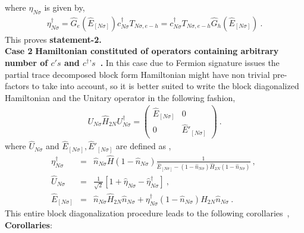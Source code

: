 \documentclass[12pt,a4paper]{article}
\begin{document}
where $\eta_{N\sigma}$ is given by,
\begin{eqnarray}
\eta^{\dagger}_{N\sigma} = \hat{G}_{e}(\hat{E}_{[N\sigma]})c^{\dagger}_{N\sigma}T_{N\sigma,e-h} = c^{\dagger}_{N\sigma}T_{N\sigma,e-h}\hat{G}_{h}(\hat{E}_{[N\sigma]})~.\nonumber
\end{eqnarray}
This proves \textbf{statement-2.}\\
\textbf{Case 2} \textbf{Hamiltonian constituted of operators containing arbitrary number of $c's$ and $c^{\dagger}\text{'}s$~.}
In this case due to Fermion signature issues the partial trace decomposed block form Hamiltonian might have non trivial pre-factors to take into account, so it is better suited to write the block diagonalized Hamiltonian and the Unitary operator in the following fashion,
\begin{eqnarray}
U_{N\sigma}\hat{H}_{2N}U^{\dagger}_{N\sigma}  =  \begin{pmatrix}
\hat{E}_{[N\sigma]} & 0\\
0 & \hat{E}'_{[N\sigma]}
\end{pmatrix}~.
\end{eqnarray} 
where $\hat{U}_{N\sigma}$ and $\hat{E}_{[N\sigma]},\hat{E}'_{[N\sigma]}$ are defined as ,
\begin{eqnarray}
\eta^{\dagger}_{N\sigma} &=& \hat{n}_{N\sigma}\hat{H}(1-\hat{n}_{N\sigma})\frac{1}{\hat{E}_{[N\sigma]} - (1-\hat{n}_{N\sigma})\hat{H}_{2N}(1-\hat{n}_{N\sigma})}~,~\nonumber\\
\hat{U}_{N\sigma} &=& \frac{1}{\sqrt{2}}\left[1+\hat{\eta}_{N\sigma}-\hat{\eta}^{\dagger}_{N\sigma}\right]~,~\nonumber\\
\hat{E}_{[N\sigma]} &=& \hat{n}_{N\sigma}\hat{H}_{2N}\hat{n}_{N\sigma} + \eta^{\dagger}_{N\sigma}(1-\hat{n}_{N\sigma})\hat{H}_{2N}\hat{n}_{N\sigma}~.
\end{eqnarray}
This entire block diagonalization procedure leads to the following corollaries~,\\
\textbf{Corollaries}: \\
\end{document}
